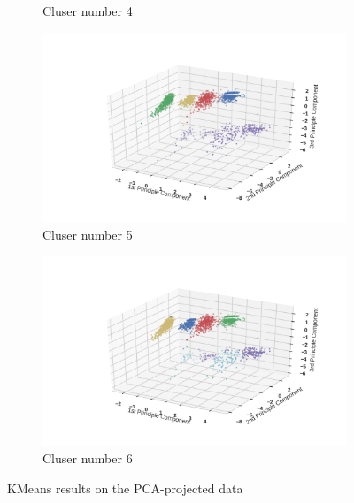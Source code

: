 \documentclass[12pt]{article}
\begin{document}
\begin{figure}
\begin{subfigure}[b]{0.31\textwidth}
        \caption{Cluser number 4}
        \label{fig:KMeans-trainbyPCA-4}
    \end{subfigure}
    
    \begin{subfigure}[b]{0.31\textwidth}
        \includegraphics[width=\textwidth]{images/KMeans-trainbyPCA-5.png}
        \caption{Cluser number 5}
        \label{fig:KMeans-trainbyPCA-5}
    \end{subfigure}
    \begin{subfigure}[b]{0.31\textwidth}
        \includegraphics[width=\textwidth]{images/KMeans-trainbyPCA-6.png}
        \caption{Cluser number 6}
        \label{fig:KMeans-trainbyPCA-6}
    \end{subfigure}
    \caption{KMeans results on the PCA-projected data}\label{fig:KMeans-trainbyPCA}
\end{figure}
\end{document}
